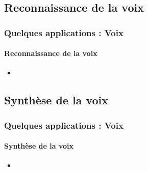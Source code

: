 \documentclass[xcolor=table]{beamer}
\begin{document}
\subsection{Reconnaissance de la voix}

\begin{frame}
	\frametitle{Quelques applications : Voix}
	\framesubtitle{Reconnaissance de la voix}
	\begin{itemize}
		\item 
	\end{itemize}
\end{frame}

\subsection{Synthèse de la voix}

\begin{frame}
	\frametitle{Quelques applications : Voix}
	\framesubtitle{Synthèse de la voix}
	\begin{itemize}
		\item 
	\end{itemize}
\end{frame}


\end{document}
